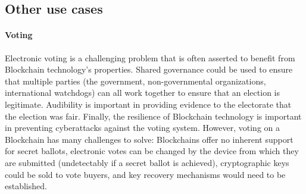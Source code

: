 


\subsection{Other use cases}

\paragraph{Voting}
Electronic voting is a challenging problem that is often asserted to benefit from Blockchain technology's properties.
Shared governance could be used to ensure that multiple parties (the government, non-governmental organizations, international watchdogs) can all work together to ensure that an election is legitimate.
Audibility is important in providing evidence to the electorate that the election was fair.
Finally, the resilience of Blockchain technology is important in preventing cyberattacks against the voting system.
However, voting on a Blockchain has many challenges to solve: Blockchains offer no inherent support for secret ballots, electronic votes can be changed by the device from which they are submitted (undetectably if a secret ballot is achieved), cryptographic keys could be sold to vote buyers, and key recovery mechanisms would need to be established. 

